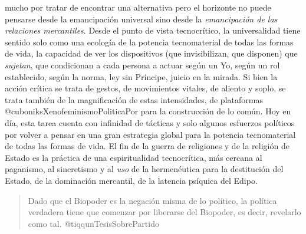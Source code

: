 \documentclass[
]{article}
\begin{document}
mucho por tratar de encontrar una alternativa pero el horizonte no puede
pensarse desde la emancipación universal sino desde la
\emph{emancipación de las relaciones mercantiles}. Desde el punto de
vista tecnocrítico, la universalidad tiene sentido solo como una
ecología de la potencia tecnomaterial de todas las formas de vida, la
capacidad de ver los dispositivos (que invisibilizan, que disponen) que
\emph{sujetan}, que condicionan a cada persona a actuar según un Yo,
según un rol establecido, según la norma, ley sin Príncipe, juicio en la
mirada. Si bien la acción crítica se trata de gestos, de movimientos
vitales, de aliento y soplo, se trata también de la magnificación de
estas intensidades, de plataformas @cuboniksXenofeminismoPoliticaPor
para la construcción de lo común. Hoy en día, esta tarea cuenta con
infinidad de tácticas y solo algunos esfuerzos políticos por volver a
pensar en una gran estrategia global para la potencia tecnomaterial de
todas las formas de vida. El fin de la guerra de religiones y de la
religión de Estado es la práctica de una espiritualidad tecnocrítica,
más cercana al paganismo, al sincretismo y al \emph{uso} de la
hermenéutica para la destitución del Estado, de la dominación mercantil,
de la latencia psíquica del Edipo.

\begin{quote}
Dado que el Biopoder es la negación misma de lo político, la política
verdadera tiene que comenzar por liberarse del Biopoder, es decir,
revelarlo como tal. @tiqqunTesisSobrePartido
\end{quote}
\end{document}
